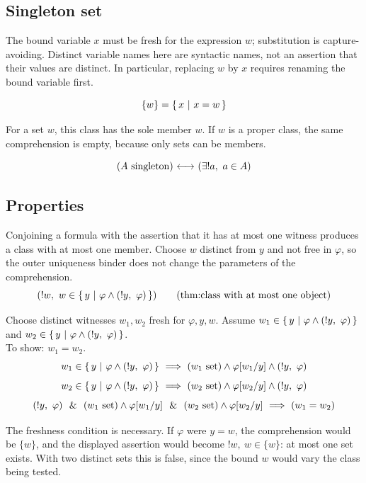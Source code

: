\subsection{Singleton set}
\begin{definition}
The bound variable $x$ must be fresh for the expression $w$; substitution
is capture-avoiding. Distinct variable names here are syntactic names,
not an assertion that their values are distinct. In particular, replacing
$w$ by $x$ requires renaming the bound variable first.

\[
\{w\} = \left\{\,x\ \middle|\ x=w\,\right\}
\]
\end{definition}
For a set $w$, this class has the sole member $w$. If $w$ is a proper
class, the same comprehension is empty, because only sets can be members.

\begin{definition}
\[
(A\mathrm{\ singleton}) {\ \longleftrightarrow\ } (\exists!a,\ a\in A)
\]
\end{definition}


\subsection{Properties}
\begin{theorem}
Conjoining a formula with the assertion that it has at most one witness
produces a class with at most one member. Choose $w$ distinct from $y$
and not free in $\varphi$, so the outer uniqueness binder does not
change the parameters of the comprehension.
\[
(!w,\ w\in \cc{y}{\varphi\land (!y,\ \varphi)})
\clabeltagd{thm}{class with at most one object}
\]
\end{theorem}
\Proof
Choose distinct witnesses $w_1,w_2$ fresh for $\varphi,y,w$.
Assume $w_1\in \cc{y}{\varphi\land (!y,\ \varphi)}$ and $w_2\in \left\{\,y\ \middle|\ \varphi\land (!y,\ \varphi)\,\right\}$.\\
To show: $w_1=w_2$.
\[
w_1\in \left\{\,y\ \middle|\ \varphi\land (!y,\ \varphi)\,\right\}
\ \Longrightarrow\ 
(w_1\mathrm{\ set})
\land
\varphi[w_1/y]
\land
(!y,\ \varphi)
\]
\[
w_2\in \left\{\,y\ \middle|\ \varphi\land (!y,\ \varphi)\,\right\}
\ \Longrightarrow\ 
(w_2\mathrm{\ set})
\land
\varphi[w_2/y]
\land
(!y,\ \varphi)
\]
\[
(!y,\ \varphi)
\ \ \&\ \ 
(w_1\mathrm{\ set})\land\varphi[w_1/y]
\ \ \&\ \ 
(w_2\mathrm{\ set})\land\varphi[w_2/y]
\ \Longrightarrow\ 
(w_1=w_2)
\]
\Done

The freshness condition is necessary. If $\varphi$ were $y=w$, the
comprehension would be $\{w\}$, and the displayed assertion would become
$!w,\ w\in\{w\}$: at most one set exists. With two distinct sets this
is false, since the bound $w$ would vary the class being tested.

